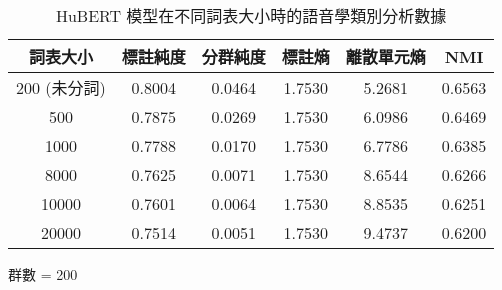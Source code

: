 \begin{table}[!htbp]
    \jefftablesep        

    \begin{subtable}[t]{\textwidth}
        \centering
        \begin{tabular}{|c|c|c|c|c|c|} \hline 
                詞表大小  & 標註純度 & 分群純度 & 標註熵 & 離散單元熵 &     NMI   \\ \hline 
200 (未分詞)&              0.8004 &   0.0464 &         1.7530 &     5.2681 &  0.6563\\ \hline 
                   500    &  0.7875  &  0.0269  & 1.7530 &  6.0986  &     0.6469  \\ \hline 
                  1000    &  0.7788  &  0.0170  & 1.7530 &  6.7786  &     0.6385  \\ \hline 
                  8000    &  0.7625  &  0.0071  & 1.7530 &  8.6544  &     0.6266  \\ \hline 
                 10000    &  0.7601  &  0.0064  & 1.7530 &  8.8535  &     0.6251  \\ \hline 
                 20000    &  0.7514  &  0.0051  & 1.7530 &  9.4737  &     0.6200   \\ \hline
        \end{tabular}
\caption{群數 = 200}
        \label{tab:ch4-hubert-pcls-clu200}
    \end{subtable}        

\caption{HuBERT 模型在不同詞表大小時的語音學類別分析數據}
    \label{tab:hubert-pcls-results}
\end{table}
